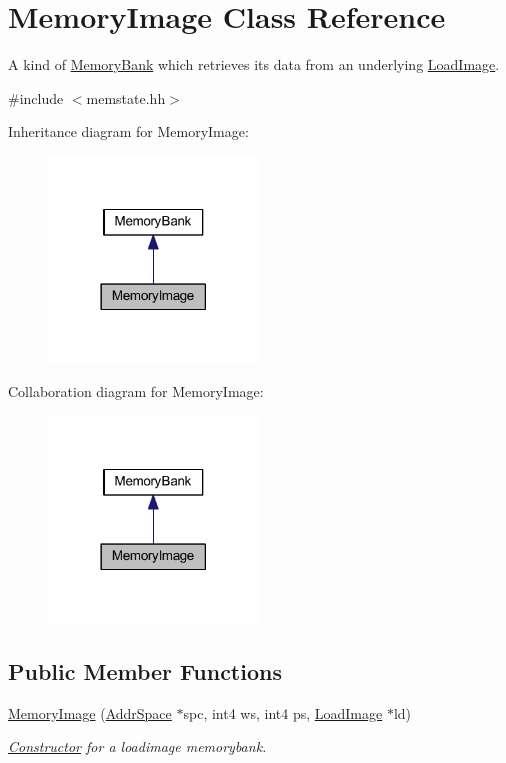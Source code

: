 \hypertarget{class_memory_image}{}\section{Memory\+Image Class Reference}
\label{class_memory_image}


A kind of \mbox{\hyperlink{class_memory_bank}{Memory\+Bank}} which retrieves its data from an underlying \mbox{\hyperlink{class_load_image}{Load\+Image}}.  




{\ttfamily \#include $<$memstate.\+hh$>$}



Inheritance diagram for Memory\+Image\+:
\nopagebreak
\begin{figure}[H]
\begin{center}
\leavevmode
\includegraphics[width=158pt]{class_memory_image__inherit__graph}
\end{center}
\end{figure}


Collaboration diagram for Memory\+Image\+:
\nopagebreak
\begin{figure}[H]
\begin{center}
\leavevmode
\includegraphics[width=158pt]{class_memory_image__coll__graph}
\end{center}
\end{figure}
\subsection*{Public Member Functions}
\begin{DoxyCompactItemize}
\item 
\mbox{\hyperlink{class_memory_image_acd1eeb4e8337a282739056e9c092fb5a}{Memory\+Image}} (\mbox{\hyperlink{class_addr_space}{Addr\+Space}} $\ast$spc, int4 ws, int4 ps, \mbox{\hyperlink{class_load_image}{Load\+Image}} $\ast$ld)
\begin{DoxyCompactList}\small\item\em \mbox{\hyperlink{class_constructor}{Constructor}} for a loadimage memorybank. \end{DoxyCompactList}\end{DoxyCompactItemize}
